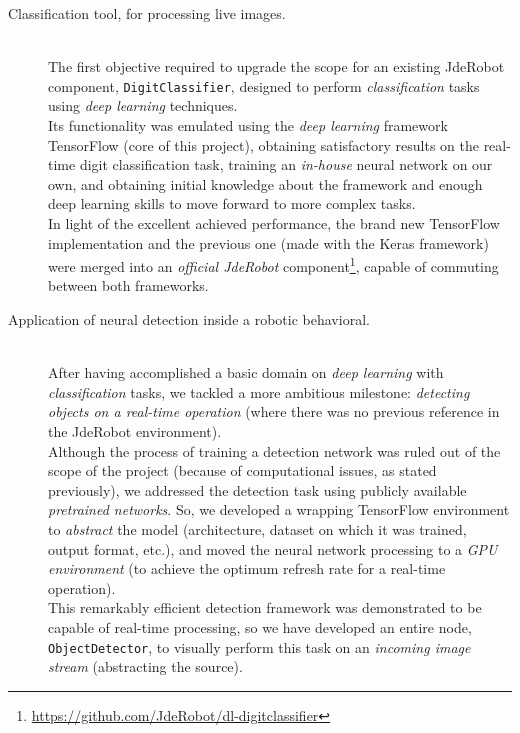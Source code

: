 	\begin{description}
		\item[Classification tool, for processing live images.] \hfill
			\vspace{0.2in} \\
			The first objective required to upgrade the scope for an existing JdeRobot component, \texttt{DigitClassifier}, designed to perform \emph{classification} tasks using \emph{deep learning} techniques.\\
			
			Its functionality was emulated using the \emph{deep learning} framework TensorFlow (core of this project), obtaining satisfactory results on the real-time digit classification task, training an \emph{in-house} neural network on our own, and obtaining initial knowledge about the framework and enough deep learning skills to move forward to more complex tasks.\\
			
			In light of the excellent achieved performance, the brand new TensorFlow implementation and the previous one (made with the Keras framework) were merged into an \emph{official JdeRobot} component\footnote{\url{https://github.com/JdeRobot/dl-digitclassifier}}, capable of commuting between both frameworks.
		
		\item[Application of neural detection inside a robotic behavioral.] \hfill
			\vspace{0.2in} \\		
			After having accomplished a basic domain on \emph{deep learning} with \emph{classification} tasks, we tackled a more ambitious milestone: \emph{detecting objects on a real-time operation} (where there was no previous reference in the JdeRobot environment).\\
			
			Although the process of training a detection network was ruled out of the scope of the project (because of computational issues, as stated previously), we addressed the detection task using publicly available \emph{pretrained networks}. So, we developed a wrapping TensorFlow environment to \emph{abstract} the model (architecture, dataset on which it was trained, output format, etc.), and moved the neural network processing to a \emph{GPU environment} (to achieve the optimum refresh rate for a real-time operation).\\
			
			This remarkably efficient detection framework was demonstrated to be capable of real-time processing, so we have developed an entire node, \texttt{ObjectDetector}, to visually perform this task on an \emph{incoming image stream} (abstracting the source).\\
			

\end{description}
